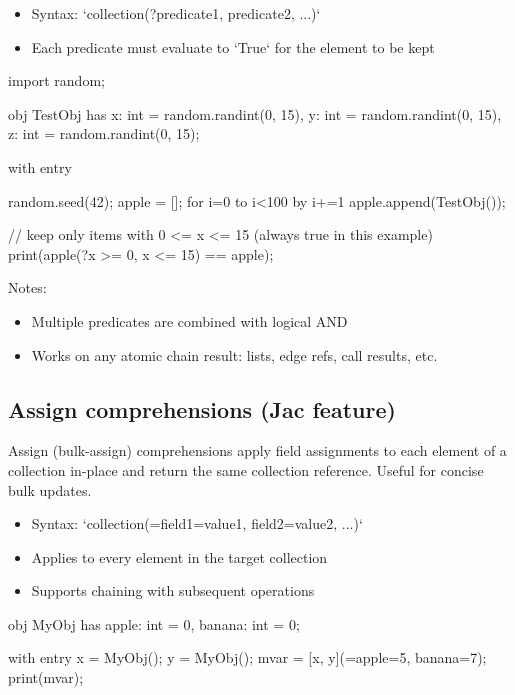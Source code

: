 \begin{itemize}
    \item Syntax: `collection(?predicate1, predicate2, ...)`
    \item Each predicate must evaluate to `True` for the element to be kept
\end{itemize}

\begin{jacblock}
import random;

obj TestObj {
    has x: int = random.randint(0, 15),
        y: int = random.randint(0, 15),
        z: int = random.randint(0, 15);
}

with entry {
    random.seed(42);
    apple = [];
    for i=0 to i<100 by i+=1  {
        apple.append(TestObj());
    }

    // keep only items with 0 <= x <= 15 (always true in this example)
    print(apple(?x >= 0, x <= 15) == apple);
}
\end{jacblock}

Notes:
\begin{itemize}
    \item Multiple predicates are combined with logical AND
    \item Works on any atomic chain result: lists, edge refs, call results, etc.
\end{itemize}

\subsection{Assign comprehensions (Jac feature)}

Assign (bulk-assign) comprehensions apply field assignments to each element of a collection in-place and return the same collection reference. Useful for concise bulk updates.

\begin{itemize}
    \item Syntax: `collection(=field1=value1, field2=value2, ...)`
    \item Applies to every element in the target collection
    \item Supports chaining with subsequent operations
\end{itemize}

\begin{jacblock}
obj MyObj {
    has apple: int = 0,
        banana: int = 0;
}

with entry {
    x = MyObj();
    y = MyObj();
    mvar = [x, y](=apple=5, banana=7);
    print(mvar);
}
\end{jacblock}

